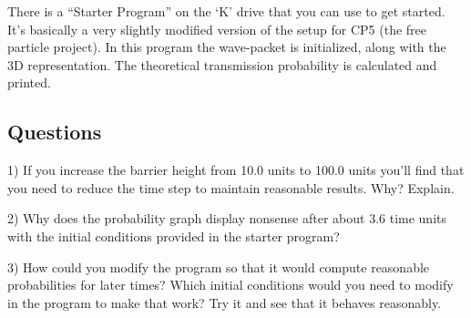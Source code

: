 \documentclass[11pt]{article} %
\begin{document}
There is a ``Starter Program'' on the `K' drive that you can use to get started. It's basically a very slightly modified version of the setup for CP5 (the free particle project). In this program the wave-packet is initialized, along with the 3D representation. The theoretical transmission probability is calculated and printed.

\subsection*{Questions}

1) If you increase the barrier height from 10.0 units to 100.0 units you'll find that you need to reduce the time step to maintain reasonable results. Why? Explain.

2) Why does the probability graph display nonsense after about 3.6 time units with the initial conditions provided in the starter program?

3) How could you modify the program so that it would compute reasonable probabilities for later times? Which initial conditions would you need to modify in the program to make that work? Try it and see that it behaves reasonably.
\end{document}
